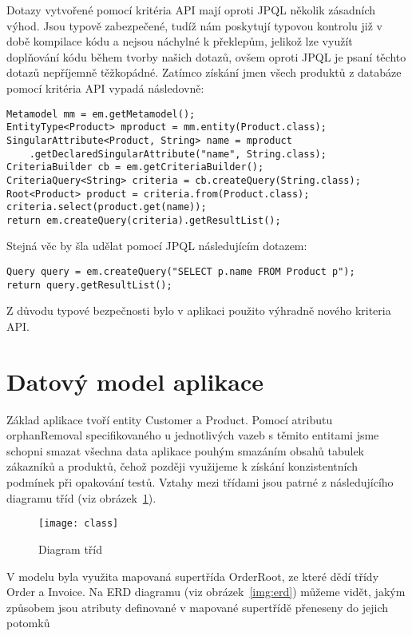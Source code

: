 \documentclass[122pt,oneside]{fithesis}
\begin{document}
Dotazy vytvořené pomocí kritéria API mají oproti JPQL několik zásadních výhod. Jsou typově zabezpečené, tudíž nám poskytují typovou kontrolu již v době kompilace kódu a nejsou náchylné k překlepům, jelikož lze využít doplňování kódu během tvorby našich dotazů, ovšem oproti JPQL je psaní těchto dotazů nepříjemně těžkopádné. Zatímco získání jmen všech produktů z databáze pomocí kritéria API vypadá následovně:

\begin{lstlisting}
Metamodel mm = em.getMetamodel();
EntityType<Product> mproduct = mm.entity(Product.class);
SingularAttribute<Product, String> name = mproduct
	.getDeclaredSingularAttribute("name", String.class);
CriteriaBuilder cb = em.getCriteriaBuilder();
CriteriaQuery<String> criteria = cb.createQuery(String.class);
Root<Product> product = criteria.from(Product.class);
criteria.select(product.get(name));
return em.createQuery(criteria).getResultList();
\end{lstlisting}

Stejná věc by šla udělat pomocí JPQL následujícím dotazem:

\begin{lstlisting}
Query query = em.createQuery("SELECT p.name FROM Product p");
return query.getResultList();
\end{lstlisting}

Z důvodu typové bezpečnosti bylo v aplikaci použito výhradně nového kriteria API.

\section{Datový model aplikace}
Základ aplikace tvoří entity Customer a Product. Pomocí atributu orphanRemoval specifikovaného u jednotlivých vazeb s těmito entitami jsme schopni smazat všechna data aplikace pouhým smazáním obsahů tabulek zákazníků a produktů, čehož později využijeme k získání konzistentních podmínek při opakování testů. Vztahy mezi třídami jsou patrné z následujícího diagramu tříd (viz obrázek~\ref{img:class}).

\begin{figure}[!ht]
\centering
\texttt{[image: class]}
\caption{Diagram tříd}
\label{img:class}
\end{figure}

V modelu byla využita mapovaná supertřída OrderRoot, ze které dědí třídy Order a Invoice. Na ERD diagramu (viz obrázek~\ref{img:erd}) můžeme vidět, jakým způsobem jsou atributy definované v mapované supertřídě přeneseny do jejich potomků
\end{document}
